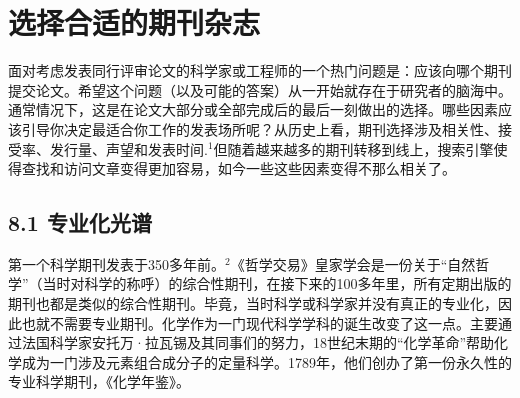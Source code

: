 \section*{选择合适的期刊杂志}
面对考虑发表同行评审论文的科学家或工程师的一个热门问题是：应该向哪个期刊提交论文。希望这个问题（以及可能的答案）从一开始就存在于研究者的脑海中。通常情况下，这是在论文大部分或全部完成后的最后一刻做出的选择。哪些因素应该引导你决定最适合你工作的发表场所呢？从历史上看，期刊选择涉及相关性、接受率、发行量、声望和发表时间.${ }^{1}$但随着越来越多的期刊转移到线上，搜索引擎使得查找和访问文章变得更加容易，如今一些这些因素变得不那么相关了。

\subsection*{8.1 专业化光谱}
第一个科学期刊发表于350多年前。${ }^{2}$《哲学交易》皇家学会是一份关于“自然哲学”（当时对科学的称呼）的综合性期刊，在接下来的100多年里，所有定期出版的期刊也都是类似的综合性期刊。毕竟，当时科学或科学家并没有真正的专业化，因此也就不需要专业期刊。化学作为一门现代科学学科的诞生改变了这一点。主要通过法国科学家安托万·拉瓦锡及其同事们的努力，18世纪末期的“化学革命”帮助化学成为一门涉及元素组合成分子的定量科学。1789年，他们创办了第一份永久性的专业科学期刊，《化学年鉴》。


